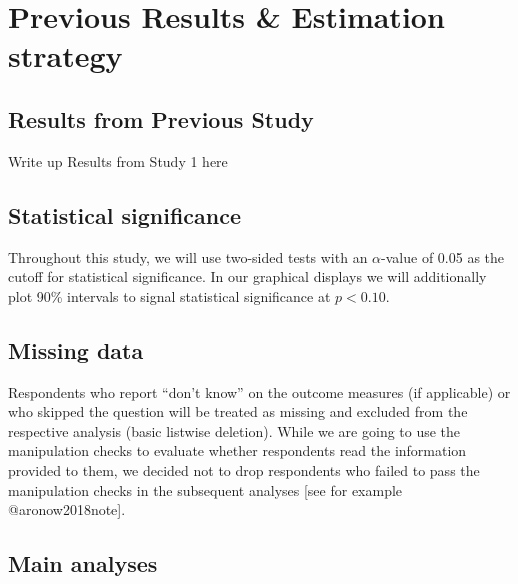 \documentclass[
]{article}
\begin{document}
\hypertarget{previous-results-estimation-strategy}{%
\section{Previous Results \& Estimation
strategy}\label{previous-results-estimation-strategy}}

\hypertarget{results-from-previous-study}{%
\subsection{Results from Previous
Study}\label{results-from-previous-study}}

Write up Results from Study 1 here

\hypertarget{statistical-significance}{%
\subsection{Statistical significance}\label{statistical-significance}}

Throughout this study, we will use two-sided tests with an
\(\alpha\)-value of 0.05 as the cutoff for statistical significance. In
our graphical displays we will additionally plot 90\% intervals to
signal statistical significance at \(p<0.10\).

\hypertarget{missing-data}{%
\subsection{Missing data}\label{missing-data}}

Respondents who report ``don't know'' on the outcome measures (if
applicable) or who skipped the question will be treated as missing and
excluded from the respective analysis (basic listwise deletion). While
we are going to use the manipulation checks to evaluate whether
respondents read the information provided to them, we decided not to
drop respondents who failed to pass the manipulation checks in the
subsequent analyses {[}see for example @aronow2018note{]}.

\hypertarget{main-analyses}{%
\subsection{Main analyses}\label{main-analyses}}
\end{document}
